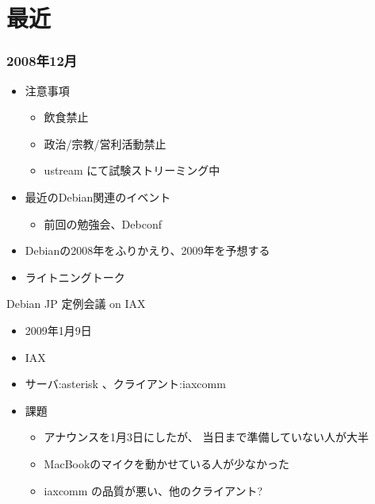 \section{最近}

\begin{frame}
 \frametitle{2008年12月}
\begin{minipage}[t]{0.45\hsize}
  \begin{itemize}
  \item 注意事項
	\begin{itemize}
	 \item 飲食禁止
	 \item 政治/宗教/営利活動禁止
	 \item ustream にて試験ストリーミング中
	\end{itemize}
  \item 最近のDebian関連のイベント
	\begin{itemize}
	 \item 前回の勉強会、Debconf
	\end{itemize}
 \end{itemize}
\end{minipage}
\begin{minipage}[t]{0.45\hsize}
 \begin{itemize}
  \item Debianの2008年をふりかえり、2009年を予想する
  \item ライトニングトーク
 \end{itemize}
\end{minipage}
\end{frame}

\begin{frame}{Debian JP 定例会議 on IAX}
\begin{itemize}
 \item 2009年1月9日
 \item IAX
 \item サーバ:asterisk 、クライアント:iaxcomm
 \item 課題
       \begin{itemize}
	\item アナウンスを1月3日にしたが、
	      当日まで準備していない人が大半
	\item MacBookのマイクを動かせている人が少なかった
	\item iaxcomm の品質が悪い、他のクライアント?
       \end{itemize}
\end{itemize}
\end{frame}

